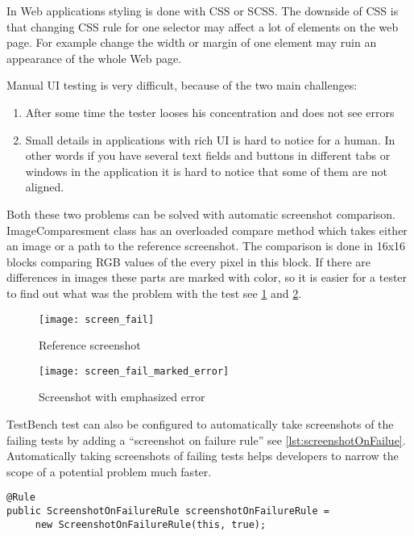 In Web applications styling is done with CSS or SCSS. The downside of CSS 
is that changing CSS rule for one selector may affect a lot of elements on the
web page. For example change the width or margin of one element may ruin an
appearance of the whole Web page.

Manual UI testing is very difficult, because of the two main challenges:
\begin{enumerate}
  \item After some time the tester looses his concentration and does not see
  errors
  \item Small details in applications with rich UI is hard to notice for a
  human. In other words if you have several text fields and buttons in different
  tabs or windows in the application it is hard to notice that some of them are
  not aligned.
\end{enumerate}

Both these two problems can be solved with automatic screenshot comparison.
ImageComparesment class has an overloaded compare method which takes either an
image or a path to the reference screenshot. The comparison is done in 16x16
blocks comparing RGB values of the every pixel in this block. If there are
differences in images these parts are marked with color, so it is easier for a
tester to find out what was the problem with the test see
\ref{fig:failedscreen} and \ref{fig:failedscreenmarked}.

	\begin{figure}
	\label{fig:failedscreen}
	\texttt{[image: screen\_fail]}
	\caption{Reference screenshot}
	\end{figure}

	\begin{figure}
	\label{fig:failedscreenmarked}
	\texttt{[image: screen\_fail\_marked\_error]}
	\caption{Screenshot with emphasized error}
	\end{figure}

TestBench test can also be configured to automatically take screenshots of the failing tests by adding
a ``screenshot on failure rule'' see \ref{lst:screenshotOnFailue}. Automatically
taking screenshots of failing tests helps developers to narrow the
scope of a potential problem much faster.

  	\begin{lstlisting}[caption=Adding screenshot on failure	rule,label={lst:screenshotOnFailue}]
@Rule
public ScreenshotOnFailureRule screenshotOnFailureRule =
	 new ScreenshotOnFailureRule(this, true);
	\end{lstlisting}


